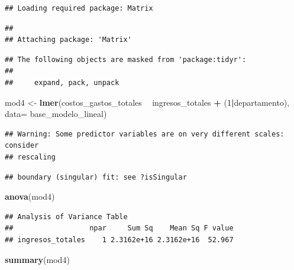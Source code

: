 \documentclass[
  11pt,
]{article}
\newenvironment{Shaded}{\begin{snugshade}}{\end{snugshade}}
\newcommand{\DataTypeTok}[1]{\textcolor[rgb]{0.13,0.29,0.53}{#1}}
\newcommand{\DecValTok}[1]{\textcolor[rgb]{0.00,0.00,0.81}{#1}}
\newcommand{\KeywordTok}[1]{\textcolor[rgb]{0.13,0.29,0.53}{\textbf{#1}}}
\newcommand{\NormalTok}[1]{#1}
\newcommand{\OperatorTok}[1]{\textcolor[rgb]{0.81,0.36,0.00}{\textbf{#1}}}
\newcommand{\StringTok}[1]{\textcolor[rgb]{0.31,0.60,0.02}{#1}}
\begin{document}
\begin{verbatim}
## Loading required package: Matrix
\end{verbatim}

\begin{verbatim}
## 
## Attaching package: 'Matrix'
\end{verbatim}

\begin{verbatim}
## The following objects are masked from 'package:tidyr':
## 
##     expand, pack, unpack
\end{verbatim}

\begin{Shaded}
\begin{Highlighting}[]
\NormalTok{mod4 <-}\StringTok{ }\KeywordTok{lmer}\NormalTok{(costos_gastos_totales }\OperatorTok{~}\StringTok{ }\NormalTok{ingresos_totales }\OperatorTok{+}\StringTok{ }\NormalTok{(}\DecValTok{1}\OperatorTok{|}\NormalTok{departamento), }\DataTypeTok{data=}\NormalTok{ base_modelo_lineal) }
\end{Highlighting}
\end{Shaded}

\begin{verbatim}
## Warning: Some predictor variables are on very different scales: consider
## rescaling
\end{verbatim}

\begin{verbatim}
## boundary (singular) fit: see ?isSingular
\end{verbatim}

\begin{Shaded}
\begin{Highlighting}[]
\KeywordTok{anova}\NormalTok{(mod4)}
\end{Highlighting}
\end{Shaded}

\begin{verbatim}
## Analysis of Variance Table
##                  npar     Sum Sq    Mean Sq F value
## ingresos_totales    1 2.3162e+16 2.3162e+16  52.967
\end{verbatim}

\begin{Shaded}
\begin{Highlighting}[]
\KeywordTok{summary}\NormalTok{(mod4)}
\end{Highlighting}
\end{Shaded}
\end{document}
